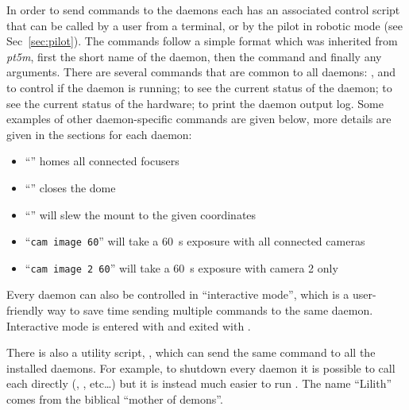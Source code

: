 \begin{colsection}
\begin{colsection}
In order to send commands to the daemons each has an associated control script that can be called by a user from a terminal, or by the pilot in robotic mode (see Sec~\ref{sec:pilot}). The commands follow a simple format which was inherited from \textit{pt5m}, first the short name of the daemon, then the command and finally any arguments. There are several commands that are common to all daemons: ,  and  to control if the daemon is running;  to see the current status of the daemon;  to see the current status of the hardware;  to print the daemon output log. Some examples of other daemon-specific commands are given below,
more details are given in the sections for each daemon:
\begin{itemize}
    \item ``'' homes all connected focusers
    \item ``'' closes the dome
    \item ``'' will slew the mount to the given coordinates
    \item ``\texttt{cam~image~60}'' will take a \SI{60}{\second} exposure with all connected cameras
    \item ``\texttt{cam~image~2~60}'' will take a \SI{60}{\second} exposure with camera 2 only
\end{itemize}

Every daemon can also be controlled in ``interactive mode'', which is a user-friendly way to save time sending multiple commands to the same daemon. Interactive mode is entered with  and exited with .

There is also a utility script, , which can send the same command to all the installed daemons. For example, to shutdown every daemon it is possible to call each directly (, ,  etc\ldots) but it is instead much easier to run . The name ``Lilith'' comes from the biblical ``mother of demons''.


\end{colsection}
\end{colsection}
